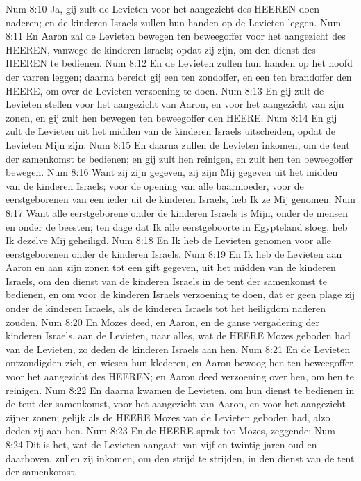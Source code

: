 Num 8:10  Ja, gij zult de Levieten voor het aangezicht des HEEREN doen naderen; en de kinderen Israels zullen hun handen op de Levieten leggen.
Num 8:11  En Aaron zal de Levieten bewegen ten beweegoffer voor het aangezicht des HEEREN, vanwege de kinderen Israels; opdat zij zijn, om den dienst des HEEREN te bedienen.
Num 8:12  En de Levieten zullen hun handen op het hoofd der varren leggen; daarna bereidt gij een ten zondoffer, en een ten brandoffer den HEERE, om over de Levieten verzoening te doen.
Num 8:13  En gij zult de Levieten stellen voor het aangezicht van Aaron, en voor het aangezicht van zijn zonen, en gij zult hen bewegen ten beweegoffer den HEERE.
Num 8:14  En gij zult de Levieten uit het midden van de kinderen Israels uitscheiden, opdat de Levieten Mijn zijn.
Num 8:15  En daarna zullen de Levieten inkomen, om de tent der samenkomst te bedienen; en gij zult hen reinigen, en zult hen ten beweegoffer bewegen.
Num 8:16  Want zij zijn gegeven, zij zijn Mij gegeven uit het midden van de kinderen Israels; voor de opening van alle baarmoeder, voor de eerstgeborenen van een ieder uit de kinderen Israels, heb Ik ze Mij genomen.
Num 8:17  Want alle eerstgeborene onder de kinderen Israels is Mijn, onder de mensen en onder de beesten; ten dage dat Ik alle eerstgeboorte in Egypteland sloeg, heb Ik dezelve Mij geheiligd.
Num 8:18  En Ik heb de Levieten genomen voor alle eerstgeborenen onder de kinderen Israels.
Num 8:19  En Ik heb de Levieten aan Aaron en aan zijn zonen tot een gift gegeven, uit het midden van de kinderen Israels, om den dienst van de kinderen Israels in de tent der samenkomst te bedienen, en om voor de kinderen Israels verzoening te doen, dat er geen plage zij onder de kinderen Israels, als de kinderen Israels tot het heiligdom naderen zouden.
Num 8:20  En Mozes deed, en Aaron, en de ganse vergadering der kinderen Israels, aan de Levieten, naar alles, wat de HEERE Mozes geboden had van de Levieten, zo deden de kinderen Israels aan hen.
Num 8:21  En de Levieten ontzondigden zich, en wiesen hun klederen, en Aaron bewoog hen ten beweegoffer voor het aangezicht des HEEREN; en Aaron deed verzoening over hen, om hen te reinigen.
Num 8:22  En daarna kwamen de Levieten, om hun dienst te bedienen in de tent der samenkomst, voor het aangezicht van Aaron, en voor het aangezicht zijner zonen; gelijk als de HEERE Mozes van de Levieten geboden had, alzo deden zij aan hen.
Num 8:23  En de HEERE sprak tot Mozes, zeggende:
Num 8:24  Dit is het, wat de Levieten aangaat: van vijf en twintig jaren oud en daarboven, zullen zij inkomen, om den strijd te strijden, in den dienst van de tent der samenkomst.
